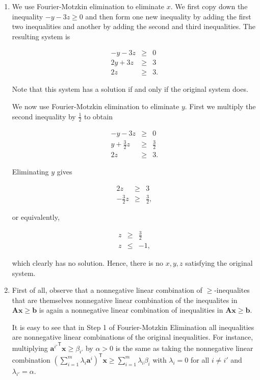 \begin{enumerate}
\def\labelenumi{\arabic{enumi}.}
\item
  We use Fourier-Motzkin elimination to eliminate \(x\). We first copy
  down the inequality \(-y-3z\geq 0\) and then form one new inequality
  by adding the first two inequalities and another by adding the second
  and third inequalities. The resulting system is

  \begin{eqnarray*}
  -y - 3z & \geq & 0 \\
   2y + 3z& \geq & 3 \\
  2z & \geq & 3.
  \end{eqnarray*}

  Note that this system has a solution if and only if the original
  system does.

  We now use Fourier-Motzkin elimination to eliminate \(y\). First we
  multiply the second inequality by \(\frac{1}{2}\) to obtain

  \begin{eqnarray*}
  -y - 3z & \geq & 0 \\
   y + \frac{3}{2}z& \geq & \frac{3}{2} \\
  2z & \geq & 3.
  \end{eqnarray*}

  Eliminating \(y\) gives

  \begin{eqnarray*}
  2z & \geq & 3 \\
   - \frac{3}{2}z& \geq & \frac{3}{2},
  \end{eqnarray*}

  or equivalently,

  \begin{eqnarray*}
  z & \geq & \frac{3}{2} \\
   z& \leq & -1,
  \end{eqnarray*}

  which clearly has no solution. Hence, there is no \(x,y,z\) satisfying
  the original system.
\item
  First of all, observe that a nonnegative linear combination of
  \(\geq\)-inequalites that are themselves nonnegative linear
  combination of the inequalites in
  \(\mathbf{A}\mathbf{x}\geq \mathbf{b}\) is again a nonnegative linear
  combination of inequalities in
  \(\mathbf{A}\mathbf{x}\geq \mathbf{b}\).

  It is easy to see that in Step 1 of Fourier-Motzkin Elimination all
  inequalities are nonnegative linear combinations of the original
  inequalities. For instance, multiplying
  \({\mathbf{a}^{i'}}^\mathsf{T}\mathbf{x} \geq \beta_{i'}\) by
  \(\alpha \gt 0\) is the same as taking the nonnegative linear
  combination
  \(\displaystyle \left(\sum_{i = 1}^m \lambda_i {\mathbf{a}^{i}}\right)^\mathsf{T}\mathbf{x} \geq \sum_{i=1}^m \lambda_i \beta_i\)
  with \(\lambda_i = 0\) for all \(i \neq i'\) and
  \(\lambda_{i'} = \alpha\).


\end{enumerate}
